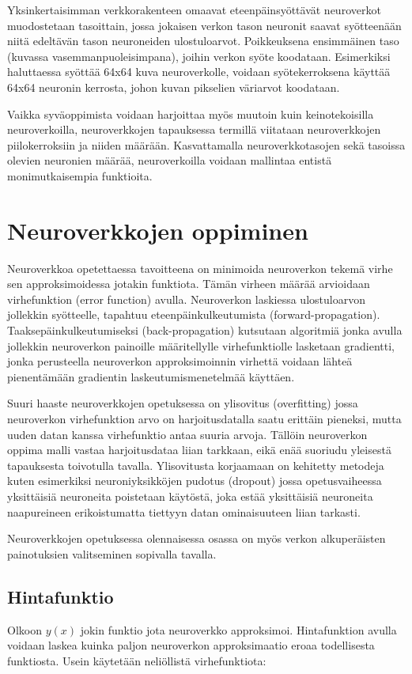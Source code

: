 \documentclass[finnish]{tktltiki2}
\theoremstyle{definition}
\theoremstyle{remark}
\begin{document}
  Yksinkertaisimman verkkorakenteen omaavat eteenpäinsyöttävät neuroverkot muodostetaan tasoittain, jossa jokaisen verkon tason neuronit saavat syötteenään niitä edeltävän tason neuroneiden ulostuloarvot. Poikkeuksena ensimmäinen taso (kuvassa vasemmanpuoleisimpana), joihin verkon syöte koodataan. Esimerkiksi haluttaessa syöttää 64x64 kuva neuroverkolle, voidaan syötekerroksena käyttää 64x64 neuronin kerrosta, johon kuvan pikselien väriarvot koodataan.

  Vaikka syväoppimista voidaan harjoittaa myös muutoin kuin keinotekoisilla neuroverkoilla, neuroverkkojen tapauksessa termillä viitataan neuroverkkojen piilokerroksiin ja niiden määrään. Kasvattamalla neuroverkkotasojen sekä tasoissa olevien neuronien määrää, neuroverkoilla voidaan mallintaa entistä monimutkaisempia funktioita.

  \section{Neuroverkkojen oppiminen}
  Neuroverkkoa opetettaessa tavoitteena on minimoida neuroverkon tekemä virhe sen approksimoidessa jotakin funktiota. Tämän virheen määrää arvioidaan virhefunktion (error function) avulla. Neuroverkon laskiessa ulostuloarvon jollekkin syötteelle, tapahtuu eteenpäinkulkeutumista (forward-propagation). Taaksepäinkulkeutumiseksi (back-propagation) kutsutaan algoritmiä jonka avulla jollekkin neuroverkon painoille määritellylle virhefunktiolle lasketaan gradientti, jonka perusteella neuroverkon approksimoinnin virhettä voidaan lähteä pienentämään gradientin laskeutumismenetelmää käyttäen.

  Suuri haaste neuroverkkojen opetuksessa on ylisovitus (overfitting) jossa neuroverkon virhefunktion arvo on harjoitusdatalla saatu erittäin pieneksi, mutta uuden datan kanssa virhefunktio antaa suuria arvoja. Tällöin neuroverkon oppima malli vastaa harjoitusdataa liian tarkkaan, eikä enää suoriudu yleisestä tapauksesta toivotulla tavalla. Ylisovitusta korjaamaan on kehitetty metodeja kuten esimerkiksi neuroniyksikköjen pudotus (dropout) jossa opetusvaiheessa yksittäisiä neuroneita poistetaan käytöstä, joka estää yksittäisiä neuroneita naapureineen erikoistumatta tiettyyn datan ominaisuuteen liian tarkasti.

  Neuroverkkojen opetuksessa olennaisessa osassa on myös verkon alkuperäisten painotuksien valitseminen sopivalla tavalla.

  \subsection{Hintafunktio}
    Olkoon $y(x)$ jokin funktio jota neuroverkko approksimoi. Hintafunktion avulla voidaan laskea kuinka paljon neuroverkon approksimaatio eroaa todellisesta funktiosta. Usein käytetään neliöllistä virhefunktiota:
\end{document}
